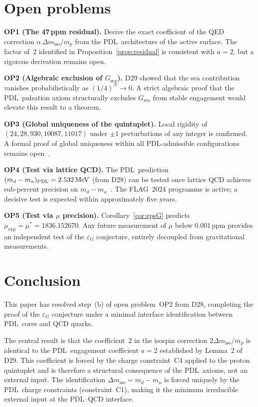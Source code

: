 \documentclass[11pt,a4paper]{article}
\theoremstyle{definition}
\newcommand{\PDL}{\textnormal{PDL}}
\newcommand{\epsg}{\varepsilon_G}
\newcommand{\muexp}{\mu_{\mathrm{exp}}}
\newcommand{\mustar}{\mu^*}
\newcommand{\dmiso}{\Delta m_{\mathrm{iso}}}
\newcommand{\Gsea}{G_{\mathrm{sea}}}
\begin{document}
\section{Open problems}
\label{sec:open}

\medskip\noindent\textbf{OP1 (The 47\,ppm residual).} Derive the exact coefficient of the QED correction $\alpha\,\dmiso/m_p$ from the \PDL\ architecture of the active surface. The factor of~$2$ identified in Proposition~\ref{prop:residual} is consistent with $a = 2$, but a rigorous derivation remains open.

\medskip\noindent\textbf{OP2 (Algebraic exclusion of $\Gsea$).} D29 showed that the sea contribution vanishes probabilistically as $(1/4)^N \to 0$. A strict algebraic proof that the \PDL\ pulsation axiom structurally excludes $\Gsea$ from stable engagement would elevate this result to a theorem.

\medskip\noindent\textbf{OP3 (Global uniqueness of the quintuplet).} Local rigidity of $(24,28,930,10087,11017)$ under $\pm 1$ perturbations of any integer is confirmed. A formal proof of global uniqueness within all \PDL-admissible configurations remains open~\cite{Bridge_PDL_2026}.

\medskip\noindent\textbf{OP4 (Test via lattice QCD).} The \PDL\ prediction $(m_d-m_u)_{\PDL} = 2.532\,\mathrm{MeV}$ (from D28) can be tested once lattice QCD achieves sub-percent precision on $m_d - m_u$~\cite{FLAG_2024}. The FLAG~2024 programme is active; a decisive test is expected within approximately five years.

\medskip\noindent\textbf{OP5 (Test via $\mu$ precision).} Corollary~\ref{cor:epsG} predicts $\muexp = \mustar = 1836.152670$. Any future measurement of $\mu$ below $0.001\,\mathrm{ppm}$ provides an independent test of the $\epsg$ conjecture, entirely decoupled from gravitational measurements.

\section*{Conclusion}

This paper has resolved step~(b) of open problem~OP2 from D28, completing the proof of the $\epsg$ conjecture under a minimal interface identification between \PDL\ cores and QCD quarks.

The central result is that the coefficient~$2$ in the isospin correction $2\dmiso/m_p$ is identical to the \PDL\ engagement coefficient $a = 2$ established by Lemma~2 of D29. This coefficient is forced by the charge constraint~C4 applied to the proton quintuplet and is therefore a structural consequence of the \PDL\ axioms, not an external input. The identification $\dmiso = m_d - m_u$ is forced uniquely by the \PDL\ charge constraints (constraint~C1), making it the minimum irreducible external input at the \PDL--QCD interface.
\end{document}
